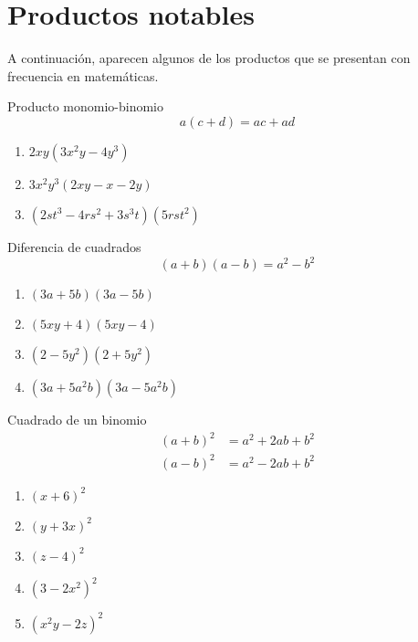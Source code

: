 \section{Productos notables}


	A continuaci\'on, aparecen algunos de los productos que se presentan con frecuencia en matemáticas.


{Producto monomio-binomio}
	\[
		a(c+d)=ac+ad
	\]	



	\begin{problema}
		\begin{enumerate}
			\item $2xy\left( 3x^{2}y - 4y^{3}\right)$ 
			\item $3x^{2}y^{3}\left( 2xy-x-2y \right)$ 
			\item $\left( 2st^{3}-4rs^{2}+3s^{3}t \right)
			\left( 5rst^{2} \right)$
		\end{enumerate}
		
	\end{problema}
	



{Diferencia de cuadrados}
	\[
		\left( a+b \right)\left( a-b \right)
		=a^{2}-b^{2}
	\]
	



	\begin{problema}
		\begin{enumerate}
			\item $\left( 3a+5b \right)\left( 3a-5b \right)$ 
			\item $\left( 5xy+4 \right)\left( 5xy-4 \right)$ 
			\item $\left( 2-5y^{2} \right)\left( 2+5y^{2} \right)$ 
			\item $\left( 3a+5a^{2}b \right)\left( 3a-5a^{2}b \right)$
		\end{enumerate}
		
	\end{problema}
	



{Cuadrado de un binomio}
	\begin{align*}
		\left( a+b \right)^{2}&=
		a^{2}+2ab+b^{2}\\
		\left( a-b \right)^{2}&=
		a^{2}-2ab+b^{2}
	\end{align*}
	



	\begin{problema}
		\begin{enumerate}
			\item $\left( x+6 \right)^{2}$ 
			\item $\left( y+3x \right)^{2}$ 
			\item $\left( z-4 \right)^{2}$ 
			\item $\left( 3-2x^{2} \right)^{2}$  
			\item $\left( x^{2}y-2z \right)^{2}$ 
		\end{enumerate}
		
	\end{problema}
	



